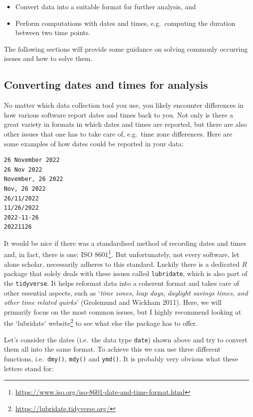 \documentclass[
  letterpaper,
]{krantz}
\renewcommand{\href}[2]{#2\footnote{\url{#1}}}
\begin{document}
\begin{itemize}
\item
  Convert data into a suitable format for further analysis, and
\item
  Perform computations with dates and times, e.g.~computing the duration
  between two time points.
\end{itemize}

The following sections will provide some guidance on solving commonly
occurring issues and how to solve them.

\subsection{Converting dates and times for
analysis}\label{sec-converting-dates-and-times-for-analysis}

No matter which data collection tool you use, you likely encounter
differences in how various software report dates and times back to you.
Not only is there a great variety in formats in which dates and times
are reported, but there are also other issues that one has to take care
of, e.g.~time zone differences. Here are some examples of how dates
could be reported in your data:

\begin{verbatim}
26 November 2022
26 Nov 2022
November, 26 2022
Nov, 26 2022
26/11/2022
11/26/2022
2022-11-26
20221126
\end{verbatim}

It would be nice if there was a standardised method of recording dates
and times and, in fact, there is one:
\href{https://www.iso.org/iso-8601-date-and-time-format.html}{ISO 8601}.
But unfortunately, not every software, let alone scholar, necessarily
adheres to this standard. Luckily there is a dedicated \emph{R} package
that solely deals with these issues called \texttt{lubridate}, which is
also part of the \texttt{tidyverse}. It helps reformat data into a
coherent format and takes care of other essential aspects, such as
`\emph{time zones, leap days, daylight savings times, and other time
related quirks}' (Grolemund and Wickham 2011). Here, we will primarily
focus on the most common issues, but I highly recommend looking at the
\href{https://lubridate.tidyverse.org/}{`lubridate' website} to see what
else the package has to offer.

Let's consider the dates (i.e.~the data type \texttt{date}) shown above
and try to convert them all into the same format. To achieve this we can
use three different functions, i.e.~\texttt{dmy()}, \texttt{mdy()} and
\texttt{ymd()}. It is probably very obvious what these letters stand
for:
\end{document}
